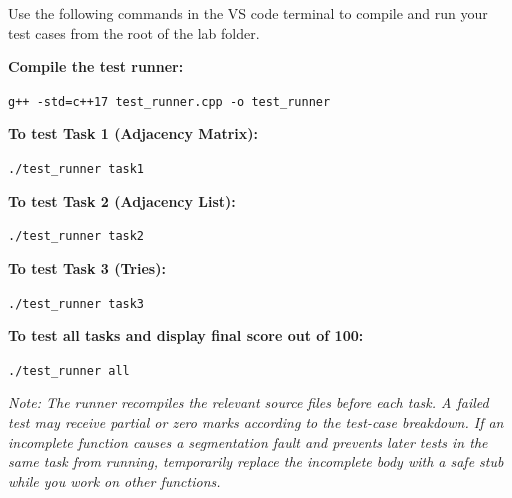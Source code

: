 \documentclass[11pt]{article}
\begin{document}
Use the following commands in the VS code terminal to compile and run your test cases from the root of the lab folder. 

\vspace{0.3cm}
\noindent\textbf{Compile the test runner:}
\begin{tcolorbox}[colback=gray!10, colframe=gray!30, sharp corners, boxrule=1pt, left=4pt, top=2pt, bottom=2pt]
\texttt{g++ -std=c++17 test\_runner.cpp -o test\_runner}
\end{tcolorbox}

\noindent\textbf{To test Task 1 (Adjacency Matrix):}
\begin{tcolorbox}[colback=gray!10, colframe=gray!30, sharp corners, boxrule=1pt, left=4pt, top=2pt, bottom=2pt]
\texttt{./test\_runner task1}
\end{tcolorbox}

\noindent\textbf{To test Task 2 (Adjacency List):}
\begin{tcolorbox}[colback=gray!10, colframe=gray!30, sharp corners, boxrule=1pt, left=4pt, top=2pt, bottom=2pt]
\texttt{./test\_runner task2}
\end{tcolorbox}

\noindent\textbf{To test Task 3 (Tries):}
\begin{tcolorbox}[colback=gray!10, colframe=gray!30, sharp corners, boxrule=1pt, left=4pt, top=2pt, bottom=2pt]
\texttt{./test\_runner task3}
\end{tcolorbox}

\noindent\textbf{To test all tasks and display final score out of 100:}
\begin{tcolorbox}[colback=gray!10, colframe=gray!30, sharp corners, boxrule=1pt, left=4pt, top=2pt, bottom=2pt]
\texttt{./test\_runner all}
\end{tcolorbox}

\noindent
\textit{Note: The runner recompiles the relevant source files before each task. A failed test may receive partial or zero marks according to the test-case breakdown. If an incomplete function causes a segmentation fault and prevents later tests in the same task from running, temporarily replace the incomplete body with a safe stub while you work on other functions.}

\vspace{0.5cm}

\end{document}
